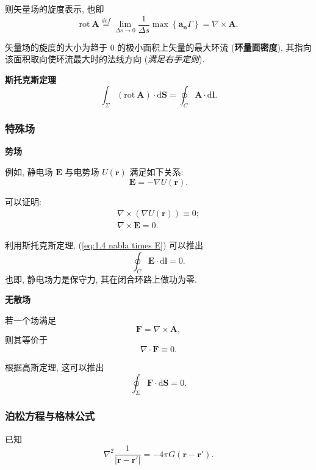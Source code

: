 则矢量场的旋度表示, 也即
\begin{equation}
    \mathrm{rot}\ \bm{A}\stackrel{def}{=}\lim_{\Delta s\rightarrow 0}\frac{1}{\Delta s}\max\left\{\bm{a_n}\Gamma\right\}=\nabla\times\bm{A}.
\end{equation}

矢量场的旋度的大小为趋于 0 的极小面积上矢量的最大环流 (\textbf{环量面密度}), 其指向该面积取向使环流最大时的法线方向 (\textit{满足右手定则}).

\textbf{斯托克斯定理}
\begin{equation}
    \int_\Sigma(\mathrm{rot}\ \bm{A})\cdot\mathrm{d}\bm{S}=\oint_C\bm{A}\cdot\mathrm{d}\bm{l}.
\end{equation}

\subsubsection{特殊场}
\textbf{势场}

例如, 静电场 $\bm{E}$ 与电势场 $U(\bm{r})$ 满足如下关系:
\begin{equation}
    \bm{E}=-\nabla U(\bm{r}).
\end{equation}

可以证明:
\begin{gather}
    \nabla\times(\nabla U(\bm{r}))\equiv 0; \\
    \nabla\times\bm{E}=0. \label{eq:1.4 nabla times E}
\end{gather}

利用斯托克斯定理, (\ref{eq:1.4 nabla times E}) 可以推出
\begin{equation}
    \oint_C\bm{E}\cdot\mathrm{d}\bm{l}=0.
\end{equation}
也即, 静电场力是保守力, 其在闭合环路上做功为零.

\textbf{无散场}

若一个场满足
\begin{equation}
    \bm{F}=\nabla\times\bm{A},
\end{equation}
则其等价于
\begin{equation}
    \nabla\cdot\bm{F}\equiv 0.
\end{equation}

根据高斯定理, 这可以推出
\begin{equation}
    \oint_\Sigma\bm{F}\cdot\mathrm{d}\bm{S}=0.
\end{equation}

\subsubsection{泊松方程与格林公式}
已知
\begin{equation} \label{eq:1.4 nabla 2 r r'}
    \nabla^2\frac{1}{|\bm{r}-\bm{r}'|}=-4\pi G(\bm{r}-\bm{r}').
\end{equation}

